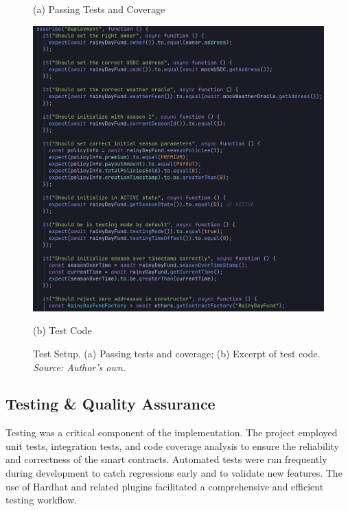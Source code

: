 \documentclass[11pt,a4paper]{article}
\begin{document}
\begin{figure}[H]
\begin{minipage}[b]{0.48\textwidth}
            \caption*{(a) Passing Tests and Coverage}
        \end{minipage}\hfill
        \begin{minipage}[b]{0.48\textwidth}
            \centering
            \includegraphics[width=0.95\linewidth]{graphics/Test_Code}
            \caption*{(b) Test Code}
        \end{minipage}
        \caption{Test Setup. (a) Passing tests and coverage; (b) Excerpt of test code. \\ \textit{Source: Author's own.}}
        \label{fig:test-set-up}
    \end{figure}

    \subsection{Testing \& Quality Assurance}\label{subsec:testing-qa}
    Testing was a critical component of the implementation. The project employed unit tests, integration tests, and code coverage analysis to ensure the reliability and correctness of the smart contracts. Automated tests were run frequently during development to catch regressions early and to validate new features. The use of Hardhat and related plugins facilitated a comprehensive and efficient testing workflow.

\end{document}
